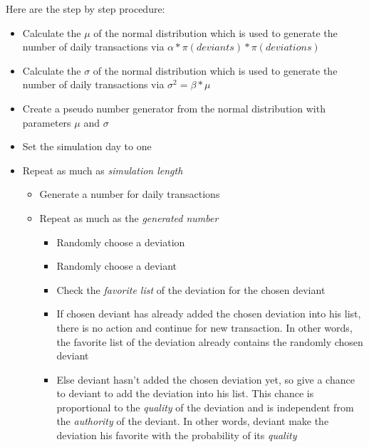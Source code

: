 \documentclass[12pt,a4paper]{report}
\begin{document}
	Here are the step by step procedure: 

\begin{itemize}

\item Calculate the $\mu$ of the normal distribution which is used to generate the number of daily transactions via $\alpha * \pi(deviants) * \pi(deviations)$

\item Calculate the $\sigma$ of the normal distribution which is used to generate the number of daily transactions via $ \sigma^2 =  \beta * \mu $

\item Create a pseudo number generator from the normal distribution with parameters $\mu$ and $\sigma$

\item Set the simulation day to one

\item Repeat as much as \emph{simulation length}

	\begin{itemize}

	\item Generate a number for daily transactions

	\item Repeat as much as the \emph{generated number}

		\begin{itemize}

		\item Randomly choose a deviation 

		\item Randomly choose a deviant 

		\item Check the \emph{favorite list} of the deviation for the chosen deviant

		\item If chosen deviant has already added the chosen deviation into his list, there is no action and continue for new transaction. In other words, the {favorite list} of the deviation  already contains the randomly chosen deviant

		\item Else deviant hasn't added the chosen deviation yet, so give a chance to deviant to add the deviation into his list. This chance is proportional to the \emph{quality} of the deviation and is independent from the \emph{authority} of the deviant. In other words, deviant make the deviation his favorite with the probability of its \emph{quality}


\end{itemize}
\end{itemize}
\end{itemize}
\end{document}
